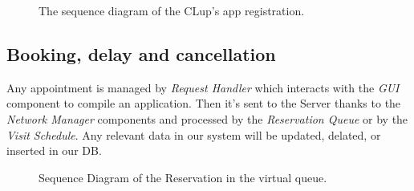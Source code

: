 \begin{figure}[H]
  \label{RegistrationSD}
  \centering
    \caption{The sequence diagram of the CLup's app registration.}
\end{figure} 

\subsection{Booking, delay and cancellation}

Any appointment is managed by \textit{Request Handler} which interacts with the \textit{GUI} component to compile an application. Then it's sent to the Server thanks to the \textit{Network Manager} components and processed by the \textit{Reservation Queue} or by the \textit{Visit Schedule}. Any relevant data in our system will be updated, delated, or inserted in our DB.


\begin{figure}[H]
  \label{ReservatioSD}
  \centering
    \caption{Sequence Diagram of the Reservation in the virtual queue.}
      \label{ReservatioSD}

\end{figure} 


